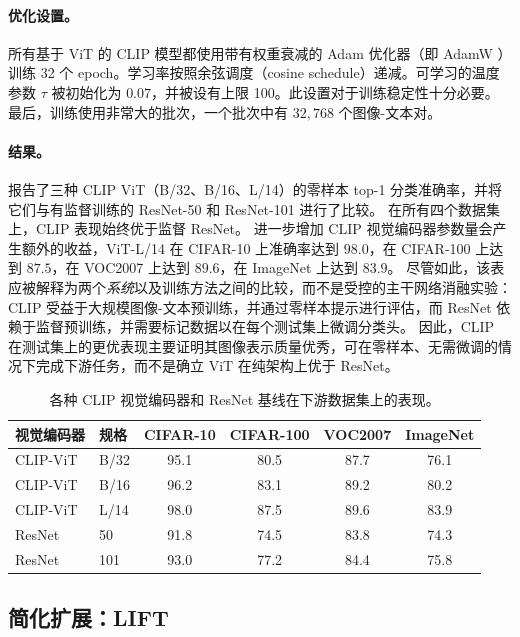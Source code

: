 \documentclass[../../book-main_zh.tex]{subfiles}
\begin{document}
\paragraph{优化设置。}
所有基于 ViT 的 CLIP 模型都使用带有权重衰减的 Adam 优化器（即 AdamW ）训练 32 个 epoch。学习率按照余弦调度（cosine schedule）递减。可学习的温度参数 \(\tau\) 被初始化为 \(0.07\)，并被设有上限 100。此设置对于训练稳定性十分必要。最后，训练使用非常大的批次，一个批次中有 \(32{,}768\) 个图像-文本对。

\paragraph{结果。} 报告了三种 CLIP ViT（B/32、B/16、L/14）的零样本 top-1 分类准确率，并将它们与有监督训练的 ResNet-50 和 ResNet-101 进行了比较。
在所有四个数据集上，CLIP 表现始终优于监督 ResNet。
进一步增加 CLIP 视觉编码器参数量会产生额外的收益，ViT-L/14 在 CIFAR-10 上准确率达到 \(98.0\)，在 CIFAR-100 上达到 \(87.5\)，在 VOC2007 上达到 \(89.6\)，在 ImageNet 上达到 \(83.9\)。
尽管如此，该表应被解释为两个\emph{系统}以及训练方法之间的比较，而不是受控的主干网络消融实验：CLIP 受益于大规模图像-文本预训练，并通过零样本提示进行评估，而 ResNet 依赖于监督预训练，并需要标记数据以在每个测试集上微调分类头。
因此，CLIP 在测试集上的更优表现主要证明其图像表示质量优秀，可在零样本、无需微调的情况下完成下游任务，而不是确立 ViT 在纯架构上优于 ResNet。

\begin{table}[t]
\centering
\begin{tabular}{@{}llcccc@{}}
\toprule
视觉编码器 & 规格 & CIFAR-10 & CIFAR-100 & VOC2007 & ImageNet \\
\midrule
CLIP-ViT & B/32 & 95.1 & 80.5 & 87.7 & 76.1 \\
CLIP-ViT & B/16 & 96.2 & 83.1 & 89.2 & 80.2 \\
CLIP-ViT & L/14 & 98.0 & 87.5 & 89.6 & 83.9 \\
\midrule
ResNet & 50  & 91.8 & 74.5 & 83.8 & 74.3 \\
ResNet & 101 & 93.0 & 77.2 & 84.4 & 75.8 \\
\bottomrule
\end{tabular}
\caption{各种 CLIP 视觉编码器和 ResNet 基线在下游数据集上的表现。}
\label{tab:clip_vs_resnet}
\end{table}

\subsection{简化扩展：LIFT}\label{sub:follow-up}
\end{document}
